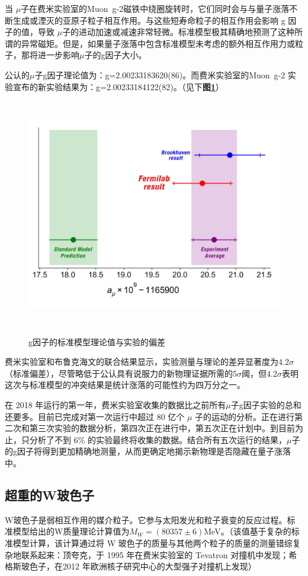 当 $\mu$子在费米实验室的Muon\ g-2磁铁中绕圈旋转时，它们同时会与与量子涨落不断生成或湮灭的亚原子粒子相互作用。与这些短寿命粒子的相互作用会影响 g 因子的值，导致 $\mu$子的进动加速或减速非常轻微。标准模型极其精确地预测了这种所谓的异常磁矩。但是，如果量子涨落中包含标准模型未考虑的额外相互作用力或粒子，那将进一步影响$\mu$子的g因子大小。

公认的$\mu$子g因子理论值为：g=2.00233183620(86)。而费米实验室的Muon\ g-2 实验宣布的新实验结果为：g=2.00233184122(82)。（见下\textbf{图\ref{fig:1.2}}）
\begin{figure}[H]
 \centering
 \caption{g因子的标准模型理论值与实验的偏差}
 \includegraphics[height=10cm, width=12cm]{pictures/Muon-g-2-results-plot.jpeg}
 \label{fig:1.2}
\end{figure}

费米实验室和布鲁克海文的联合结果显示，实验测量与理论的差异显著度为$4.2\sigma$（标准偏差），尽管略低于公认具有说服力的新物理证据所需的$5\sigma$阈，但$4.2\sigma$表明这次与标准模型的冲突结果是统计涨落的可能性约为四万分之一。

在 2018 年运行的第一年，费米实验室收集的数据比之前所有$\mu$子g因子实验的总和还要多。目前已完成对第一次运行中超过 80 亿个 $\mu$ 子的运动的分析。正在进行第二次和第三次实验的数据分析，第四次正在进行中，第五次正在计划中。到目前为止，只分析了不到 6\% 的实验最终将收集的数据。结合所有五次运行的结果，$\mu$子的g因子将得到更加精确地测量，从而更确定地揭示新物理是否隐藏在量子涨落中。

\subsection{超重的W玻色子}
W玻色子是弱相互作用的媒介粒子。它参与太阳发光和粒子衰变的反应过程。标准模型给出的W质量理论计算值为$M_W=(80357\pm6)$MeV。（该值基于复杂的标准模型计算，该计算通过将 W 玻色子的质量与其他两个粒子的质量的测量错综复杂地联系起来：顶夸克，于 1995 年在费米实验室的 Tevatron 对撞机中发现；希格斯玻色子，在2012 年欧洲核子研究中心的大型强子对撞机上发现）

